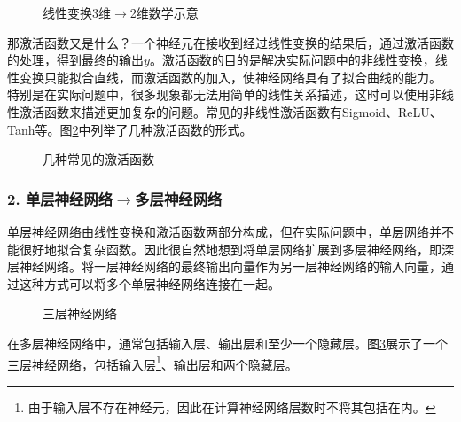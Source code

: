 \vspace{-0.5em}
\begin{figure}[htp]
\centering

\caption{线性变换3维$ \rightarrow $2维数学示意}
\label{fig:9-14}
\end{figure}

\vspace{-0.5em}
\parinterval 那激活函数又是什么？一个神经元在接收到经过线性变换的结果后，通过激活函数的处理，得到最终的输出$ y $。激活函数的目的是解决实际问题中的非线性变换，线性变换只能拟合直线，而激活函数的加入，使神经网络具有了拟合曲线的能力。 特别是在实际问题中，很多现象都无法用简单的线性关系描述，这时可以使用非线性激活函数来描述更加复杂的问题。常见的非线性激活函数有Sigmoid、ReLU、Tanh等。图\ref{fig:9-15}中列举了几种激活函数的形式。

\begin{figure}[htp]
\centering

\caption{几种常见的激活函数}
\label{fig:9-15}
\end{figure}


\vspace{-0.5em}
\subsubsection{2. 单层神经网络$\rightarrow$多层神经网络}

\parinterval 单层神经网络由线性变换和激活函数两部分构成，但在实际问题中，单层网络并不能很好地拟合复杂函数。因此很自然地想到将单层网络扩展到多层神经网络，即深层神经网络。将一层神经网络的最终输出向量作为另一层神经网络的输入向量，通过这种方式可以将多个单层神经网络连接在一起。

\begin{figure}[htp]
\centering

\caption{三层神经网络}
\label{fig:9-17}
\end{figure}

\parinterval 在多层神经网络中，通常包括输入层、输出层和至少一个隐藏层。图\ref{fig:9-17}展示了一个三层神经网络，包括输入层\footnote{由于输入层不存在神经元，因此在计算神经网络层数时不将其包括在内。}、输出层和两个隐藏层。\\


